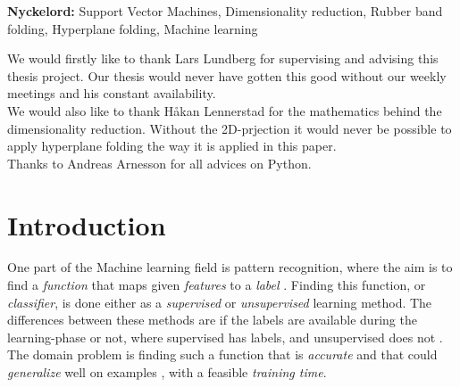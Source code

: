 \documentclass[a4paper,twoside]{bth}
\begin{document}
\vspace{1cm}
\noindent
\textbf{Nyckelord:} Support Vector Machines, Dimensionality reduction, Rubber band folding, Hyperplane folding, Machine learning

\cleardoublepage


\acknowledgments %
\noindent
We would firstly like to thank Lars Lundberg for supervising and advising this thesis project. Our thesis would never have gotten this good without our weekly meetings and his constant availability.\\
We would also like to thank Håkan Lennerstad for the mathematics behind the dimensionality reduction. Without the 2D-prjection it would never be possible to apply hyperplane folding the way it is applied in this paper.\\
Thanks to Andreas Arnesson for all advices on Python.

\cleardoublepage


\tableofcontents

\cleardoublepage
\pagestyle{headings}



\chapter{Introduction}
\label{sec:introduction}  %
One part of the Machine learning field is pattern recognition, where the aim is to find a \textit{function} that maps given \textit{features} to a \textit{label} \cite{Japkowicz:2011}. Finding this function, or \textit{classifier}, is done either as a \textit{supervised} or \textit{unsupervised} learning method. The differences between these methods are if the labels are available during the learning-phase or not, where supervised has labels, and unsupervised does not \cite{Japkowicz:2011}. The domain problem is finding such a function that is \textit{accurate} and that could \textit{generalize} well on examples \cite{multiconlitron}, with a feasible \textit{training time}.
\end{document}
